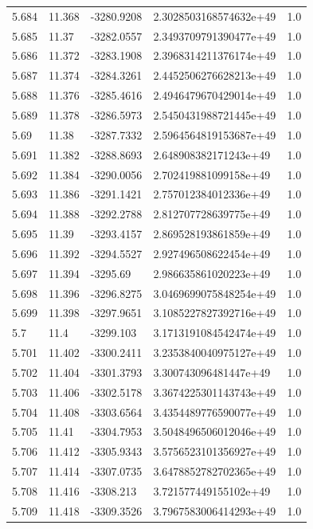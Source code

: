 \begin{tabular}{lllll}
5.684 & 11.368 & -3280.9208 & 2.3028503168574632e+49 & 1.0 \\
5.685 & 11.37 & -3282.0557 & 2.3493709791390477e+49 & 1.0 \\
5.686 & 11.372 & -3283.1908 & 2.3968314211376174e+49 & 1.0 \\
5.687 & 11.374 & -3284.3261 & 2.4452506276628213e+49 & 1.0 \\
5.688 & 11.376 & -3285.4616 & 2.4946479670429014e+49 & 1.0 \\
5.689 & 11.378 & -3286.5973 & 2.5450431988721445e+49 & 1.0 \\
5.69 & 11.38 & -3287.7332 & 2.5964564819153687e+49 & 1.0 \\
5.691 & 11.382 & -3288.8693 & 2.648908382171243e+49 & 1.0 \\
5.692 & 11.384 & -3290.0056 & 2.702419881099158e+49 & 1.0 \\
5.693 & 11.386 & -3291.1421 & 2.757012384012336e+49 & 1.0 \\
5.694 & 11.388 & -3292.2788 & 2.812707728639775e+49 & 1.0 \\
5.695 & 11.39 & -3293.4157 & 2.869528193861859e+49 & 1.0 \\
5.696 & 11.392 & -3294.5527 & 2.927496508622454e+49 & 1.0 \\
5.697 & 11.394 & -3295.69 & 2.986635861020223e+49 & 1.0 \\
5.698 & 11.396 & -3296.8275 & 3.0469699075848254e+49 & 1.0 \\
5.699 & 11.398 & -3297.9651 & 3.1085227827392716e+49 & 1.0 \\
5.7 & 11.4 & -3299.103 & 3.1713191084542474e+49 & 1.0 \\
5.701 & 11.402 & -3300.2411 & 3.2353840040975127e+49 & 1.0 \\
5.702 & 11.404 & -3301.3793 & 3.300743096481447e+49 & 1.0 \\
5.703 & 11.406 & -3302.5178 & 3.3674225301143743e+49 & 1.0 \\
5.704 & 11.408 & -3303.6564 & 3.4354489776590077e+49 & 1.0 \\
5.705 & 11.41 & -3304.7953 & 3.5048496506012046e+49 & 1.0 \\
5.706 & 11.412 & -3305.9343 & 3.5756523101356927e+49 & 1.0 \\
5.707 & 11.414 & -3307.0735 & 3.6478852782702365e+49 & 1.0 \\
5.708 & 11.416 & -3308.213 & 3.721577449155102e+49 & 1.0 \\
5.709 & 11.418 & -3309.3526 & 3.7967583006414293e+49 & 1.0 \\

\end{tabular}
